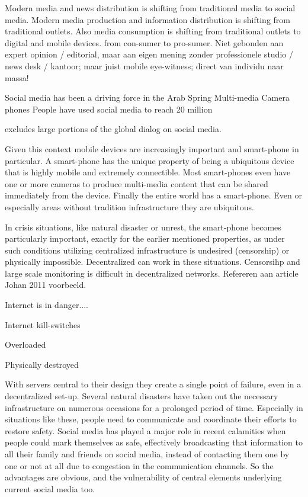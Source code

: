 
Modern media and news distribution is shifting from traditional media to social media.
Modern media production and information distribution is shifting from traditional outlets.
Also media consumption is shifting from traditional outlets to digital and mobile devices.
from con-sumer to pro-sumer.
Niet gebonden aan expert opinion / editorial, maar aan eigen mening zonder professionele studio / news desk / kantoor; maar juist mobile eye-witness; direct van individu naar massa!

Social media has been a driving force in the Arab Spring 
Multi-media 
Camera phones
People have used social media to reach 20 million 


excludes large portions of the global dialog on social media.


Given this context mobile devices are increasingly important and smart-phone in particular.
A smart-phone has the unique property of being a ubiquitous device that is highly mobile and extremely connectible.
Most smart-phones even have one or more cameras to produce multi-media content that can be shared immediately from the device.
Finally the entire world has a smart-phone.
Even or especially areas without tradition infrastructure they are ubiquitous.


In crisis situations, like natural disaster or unrest, the smart-phone becomes particularly important, exactly for the earlier mentioned properties, as under such conditions utilizing centralized infrastructure is undesired (censorship) or physically impossible.
Decentralized can work in these situations.
Censorsihp and large scale monitoring is difficult in decentralized networks.
Refereren aan article Johan 2011 voorbeeld.

Internet is in danger....


Internet kill-switches

Overloaded

Physically destroyed

With servers central to their design they create a single point of failure, even in a decentralized set-up.
Several natural disasters have taken out the necessary infrastructure on numerous occasions for a prolonged period of time.
Especially in situations like these, people need to communicate and coordinate their efforts to restore safety.
Social media has played a major role in recent calamities when people could mark themselves as safe, effectively broadcasting that information to all their family and friends on social media, instead of contacting them one by one or not at all due to congestion in the communication channels.
So the advantages are obvious, and the vulnerability of central elements underlying current social media too.


